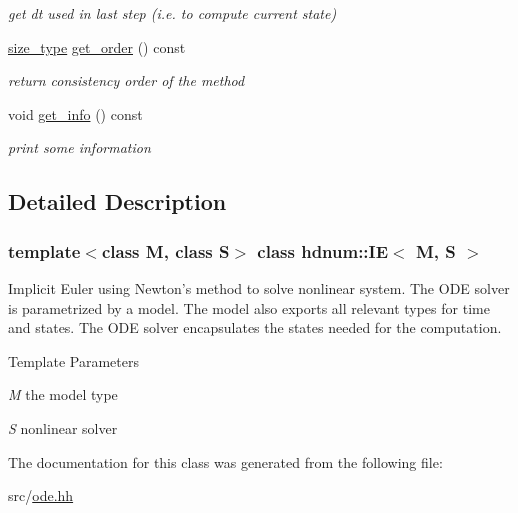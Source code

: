 \begin{DoxyCompactItemize}
\begin{DoxyCompactList}\small\item\em get dt used in last step (i.e. to compute current state) \item\end{DoxyCompactList}\item 
\hypertarget{classhdnum_1_1IE_acbc50aab0984aa2fc0d59ad02fb530fb}{
\hyperlink{classhdnum_1_1IE_af2d3dd8c57bb78dfd28a613dd11f499a}{size\_\-type} \hyperlink{classhdnum_1_1IE_acbc50aab0984aa2fc0d59ad02fb530fb}{get\_\-order} () const }
\label{classhdnum_1_1IE_acbc50aab0984aa2fc0d59ad02fb530fb}

\begin{DoxyCompactList}\small\item\em return consistency order of the method \item\end{DoxyCompactList}\item 
\hypertarget{classhdnum_1_1IE_ac0cc9141ec0c29ea465ffc4b416a52a8}{
void \hyperlink{classhdnum_1_1IE_ac0cc9141ec0c29ea465ffc4b416a52a8}{get\_\-info} () const }
\label{classhdnum_1_1IE_ac0cc9141ec0c29ea465ffc4b416a52a8}

\begin{DoxyCompactList}\small\item\em print some information \item\end{DoxyCompactList}\end{DoxyCompactItemize}


\subsection{Detailed Description}
\subsubsection*{template$<$class M, class S$>$ class hdnum::IE$<$ M, S $>$}

Implicit Euler using Newton's method to solve nonlinear system. The ODE solver is parametrized by a model. The model also exports all relevant types for time and states. The ODE solver encapsulates the states needed for the computation.


\begin{DoxyTemplParams}{Template Parameters}
\item[{\em M}]the model type \item[{\em S}]nonlinear solver \end{DoxyTemplParams}


The documentation for this class was generated from the following file:\begin{DoxyCompactItemize}
\item 
src/\hyperlink{ode_8hh}{ode.hh}\end{DoxyCompactItemize}
